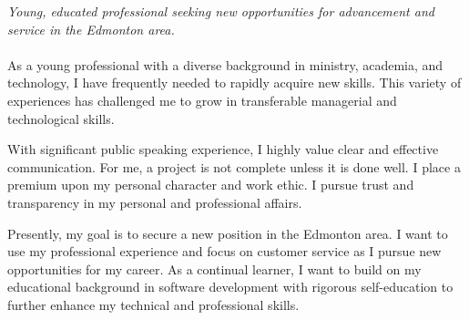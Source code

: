 
\vspace{-1.3em} %

\begin{multicols}{2}  %
\noindent \textit{Young, educated professional seeking new opportunities for advancement and service in the Edmonton area.}\\\\

As a young professional with a diverse background in ministry, academia, and technology, I have frequently needed to rapidly acquire new skills. This variety of experiences has challenged me to grow in transferable managerial and technological skills.

With significant public speaking experience, I highly value clear and effective communication. For me, a project is not complete unless it is done well. I place a premium upon my personal character and work ethic. I pursue trust and transparency in my personal and professional affairs.

Presently, my goal is to secure a new position in the Edmonton area. I want to use my professional experience and focus on customer service as I pursue new opportunities for my career. As a continual learner, I want to build on my educational background in software development with rigorous self-education to further enhance my technical and professional skills.

\end{multicols}

